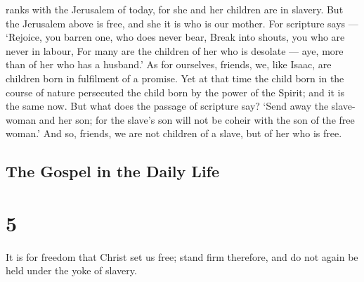 ranks with the Jerusalem of today, for she and her children are in
slavery.  But the Jerusalem above is free, and she it is
who is our mother.  For scripture says --- `Rejoice, you
barren one, who does never bear, Break into shouts, you who are never in
labour, For many are the children of her who is desolate --- aye, more
than of her who has a husband.'  As for ourselves, friends,
we, like Isaac, are children born in fulfilment of a promise.
 Yet at that time the child born in the course of nature
persecuted the child born by the power of the Spirit; and it is the same
now.  But what does the passage of scripture say? `Send
away the slave-woman and her son; for the slave's son will not be coheir
with the son of the free woman.'  And so, friends, we are
not children of a slave, but of her who is free.

\hypertarget{the-gospel-in-the-daily-life}{%
\subsection{The Gospel in the Daily
Life}\label{the-gospel-in-the-daily-life}}

\hypertarget{section-4}{%
\section{5}\label{section-4}}

 It is for freedom that Christ set us free; stand firm
therefore, and do not again be held under the yoke of slavery.

